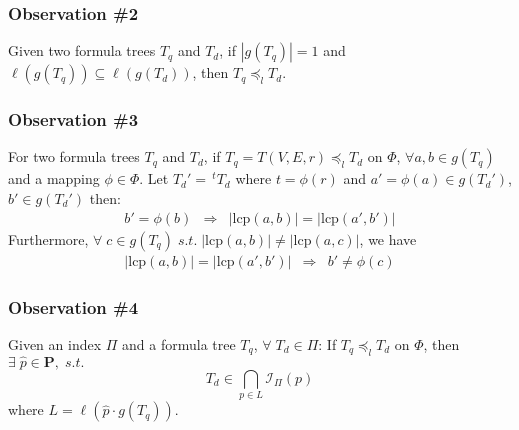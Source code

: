 \subsubsection*{Observation \#2} 
Given two formula trees $T_q$ and $T_d$, if $\left| g(T_q) \right| = 1$ and $\ell(g(T_{q})) \subseteq \ell(g(T_d))$, then $T_q \preceq_l T_d$.

\subsubsection*{Observation \#3} 
For two formula trees $T_q$ and $T_d$, if $T_q = T(V,E,r) \preceq_l T_d$ on $\Phi$,  
$\forall a,b \in g(T_q)$ and a mapping $\phi \in \Phi$. 
Let $T_d' = \, ^{t}T_d$ where $t = \phi(r)$ and $a' = \phi(a) \in g(T_d')$, $b' \in g(T_d')$ then:
$$
\begin{array}{lcr}
b' = \phi(b)  & \Rightarrow & 
\left| \mathrm{lcp}(a,b) \right| = \left| \mathrm{lcp}(a',b') \right|
\end{array}
$$
Furthermore, $\forall\; c \in g(T_q)\; s.t.\; \left| \mathrm{lcp}(a,b) \right| \neq \left| \mathrm{lcp}(a,c) \right| $, we have
$$
\begin{array}{lcr}
\left| \mathrm{lcp}(a,b) \right| = \left| \mathrm{lcp}(a',b') \right|
& \Rightarrow &
b' \neq \phi(c)
\end{array} 
$$

\subsubsection*{Observation \#4} 
Given an index $\Pi$ and a formula tree $T_q$, $\forall\; T_d \in \Pi$:
If $T_q \preceq_l T_d$ on $\Phi$, then $\exists\; \hat{p} \in \mathbf{P},\; s.t.$
$$
T_d \in \bigcap_{p \in L} \mathcal{I}_{\Pi}(p)
$$
where $L = \ell(\hat{p} \cdot g(T_q))$.

